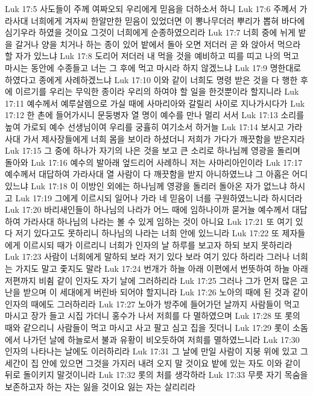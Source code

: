 Luk 17:5  사도들이 주께 여짜오되 우리에게 믿음을 더하소서 하니
Luk 17:6  주께서 가라사대 너희에게 겨자씨 한알만한 믿음이 있었더면 이 뽕나무더러 뿌리가 뽑혀 바다에 심기우라 하였을 것이요 그것이 너희에게 순종하였으리라
Luk 17:7  너희 중에 뉘게 밭을 갈거나 양을 치거나 하는 종이 있어 밭에서 돌아 오면 저더러 곧 와 앉아서 먹으라 할 자가 있느냐
Luk 17:8  도리어 저더러 내 먹을 것을 예비하고 띠를 띠고 나의 먹고 마시는 동안에 수종들고 너는 그 후에 먹고 마시라 하지 않겠느냐
Luk 17:9  명한대로 하였다고 종에게 사례하겠느냐
Luk 17:10  이와 같이 너희도 명령 받은 것을 다 행한 후에 이르기를 우리는 무익한 종이라 우리의 하여야 할 일을 한것뿐이라 할지니라
Luk 17:11  예수께서 예루살렘으로 가실 때에 사마리아와 갈릴리 사이로 지나가시다가
Luk 17:12  한 촌에 들어가시니 문둥병자 열 명이 예수를 만나 멀리 서서
Luk 17:13  소리를 높여 가로되 예수 선생님이여 우리를 궁휼히 여기소서 하거늘
Luk 17:14  보시고 가라사대 가서 제사장들에게 너희 몸을 보이라 하셨더니 저희가 가다가 깨끗함을 받은지라
Luk 17:15  그 중에 하나가 자기의 나은 것을 보고 큰 소리로 하나님께 영광을 돌리며 돌아와
Luk 17:16  예수의 발아래 엎드리어 사례하니 저는 사마리아인이라
Luk 17:17  예수께서 대답하여 가라사대 열 사람이 다 깨끗함을 받지 아니하였느냐 그 아홉은 어디 있느냐
Luk 17:18  이 이방인 외에는 하나님께 영광을 돌리러 돌아온 자가 없느냐 하시고
Luk 17:19  그에게 이르시되 일어나 가라 네 믿음이 너를 구원하였느니라 하시더라
Luk 17:20  바리새인들이 하나님의 나라가 어느 때에 임하나이까 묻거늘 예수께서 대답하여 가라사대 하나님의 나라는 볼 수 있게 임하는 것이 아니요
Luk 17:21  또 여기 있다 저기 있다고도 못하리니 하나님의 나라는 너희 안에 있느니라
Luk 17:22  또 제자들에게 이르시되 때가 이르리니 너희가 인자의 날 하루를 보고자 하되 보지 못하리라
Luk 17:23  사람이 너희에게 말하되 보라 저기 있다 보라 여기 있다 하리라 그러나 너희는 가지도 말고 좇지도 말라
Luk 17:24  번개가 하늘 아래 이편에서 번뜻하여 하늘 아래 저편까지 비췸 같이 인자도 자기 날에 그러하리라
Luk 17:25  그러나 그가 먼저 많은 고난을 받으며 이 세대에게 버린바 되어야 할지니라
Luk 17:26  노아의 때에 된 것과 같이 인자의 때에도 그러하리라
Luk 17:27  노아가 방주에 들어가던 날까지 사람들이 먹고 마시고 장가 들고 시집 가더니 홍수가 나서 저희를 다 멸하였으며
Luk 17:28  또 롯의 때와 같으리니 사람들이 먹고 마시고 사고 팔고 심고 집을 짓더니
Luk 17:29  롯이 소돔에서 나가던 날에 하늘로서 불과 유황이 비오듯하여 저희를 멸하였느니라
Luk 17:30  인자의 나타나는 날에도 이러하리라
Luk 17:31  그 날에 만일 사람이 지붕 위에 있고 그 세간이 집 안에 있으면 그것을 가지러 내려 오지 말 것이요 밭에 있는 자도 이와 같이 뒤로 돌이키지 말것이니라
Luk 17:32  롯의 처를 생각하라
Luk 17:33  무릇 자기 목숨을 보존하고자 하는 자는 잃을 것이요 잃는 자는 살리리라
